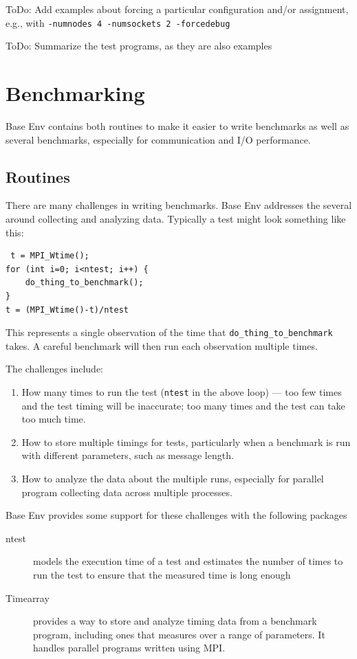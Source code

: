 \documentclass[11pt,letterpaper]{report}
\begin{document}
ToDo: Add examples about forcing a particular configuration and/or
assignment, e.g., with \texttt{-numnodes 4 -numsockets 2 -forcedebug}

ToDo: Summarize the test programs, as they are also examples

\chapter{Benchmarking}
Base Env contains both routines to make it easier to write benchmarks as well
as several benchmarks, especially for communication and I/O performance.

\section{Routines}
There are many challenges in writing benchmarks. Base Env addresses
the several around collecting and analyzing data.
Typically a test might look something like this:
\begin{verbatim}
 t = MPI_Wtime();
for (int i=0; i<ntest; i++) {
    do_thing_to_benchmark();
}
t = (MPI_Wtime()-t)/ntest
\end{verbatim}
This represents a single observation of the time that
\texttt{do\_thing\_to\_benchmark} takes.
A careful benchmark will then run each observation multiple times.

The challenges include:
\begin{enumerate}
\item How many times to run the test (\texttt{ntest} in the above
  loop) --- too few times and
  the test timing will be inaccurate; too many times and the test can
  take too much time.
\item How to store multiple timings for tests, particularly when a
  benchmark is run with different parameters, such as message length.
\item How to analyze the data about the multiple runs, especially for
  parallel program collecting data across multiple processes.
\end{enumerate}

Base Env provides some support for these challenges with the following
packages
\begin{description}
\item[ntest] models the execution time of a test and estimates
  the number of times to run the test to ensure that the measured time
  is long enough
\item[Timearray] provides a way to store and analyze timing data from
  a benchmark program, including ones that measures over a range of
  parameters. It handles parallel programs written using MPI.
\end{description}
\end{document}
